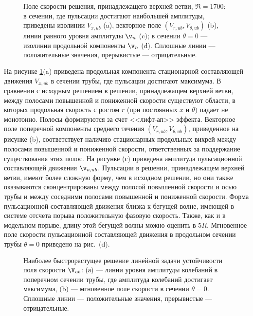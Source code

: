 \begin{figure}
\caption{Поле скорости решения, принадлежащего верхней ветви, $\Re = 1700$: в сечении, где пульсации достигают наибольшей амплитуды, приведены изолинии $V_{x,ub}$ (a), векторное поле $(V_{r,ub}, V_{\theta,ub})$ (b), линии равного уровня амплитуды $\v_n$ (c); в сечении $\theta = 0$ --- изолинии продольной компоненты $\v_n$ (d). Сплошные линии --- положительные значения, прерывистые --- отрицательные.}
\label{local_ub_means_pic}
\end{figure}

На рисунке \ref{local_ub_means_pic}(a) приведена продольная компонента стационарной составляющей движения $V_{x,ub}$ в сечении трубы, где пульсации достигают максимума. В сравнении с исходным решением в решении, принадлежащем верхней ветви, между полосами повышенной и пониженной скорости существуют области, в которых продольная скорость с ростом $r$ (при постоянных $x$ и $\theta$) падает не монотонно. Полосы формируются за счет <<лифт-ап>> эффекта. Векторное поле поперечной компоненты среднего течения $(V_{r,ub}, V_{\theta,ub})$, приведенное на рисунке (b), соответствует наличию стационарных продольных вихрей между полосами повышенной и пониженной скорости, ответственных за поддержание существования этих полос. На рисунке (с) приведена амплитуда пульсационной составляющей движения $\v_{n,ub}$. Пульсации в решении, принадлежащем верхней ветви, имеют более сложную форму, чем в исходном решении, но они также оказываются сконцентрированы между полосой повышенной скорости и осью трубы и между соседними полосами повышенной и пониженной скорости. Форма пульсационной составляющей движения близка к бегущей волне, имеющей в системе отсчета порыва положительную фазовую скорость. Также, как и в модельном порыве, длину этой бегущей волны можно оценить в $5R$. Мгновенное поле скорости пульсационной составляющей движения в продольном сечении трубы $\theta = 0$ приведено на рис.~(d).  


\begin{figure}
\caption{Наиболее быстрорастущее решение линейной задачи устойчивости поля скорости $\V_{ub}$:  (а) --- линии уровня амплитуды колебаний в поперечном сечении трубы, где амплитуда колебаний достигает максимума, (b) --- мгновенное поле скорости в сечении $\theta = 0$. Сплошные линии --- положительные значения, прерывистые --- отрицательные.}
\label{ub_lin_pic}
\end{figure}

